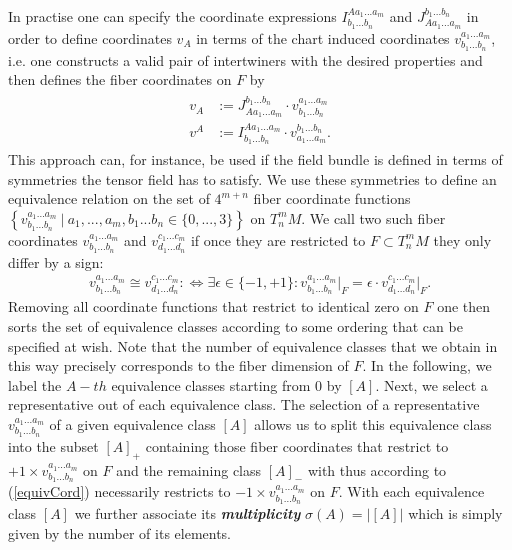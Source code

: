 \documentclass[a4paper,12pt, DIV=14, BCOR=5mm, twoside, headsepline, numbers=noenddot]{scrbook}
\begin{document}
In practise one can specify the coordinate expressions $I^{A a_1 ... a_m}_{b_1 ... b_n}$ and $J^{b_1 ... b_n}_{A a_1 ... a_m}$ in order to define coordinates $v_A$ in terms of the chart induced coordinates $v^{a_1 ... a_m}_{b_1 ... b_n}$, i.e. one constructs a valid pair of intertwiners with the desired properties and then defines the fiber coordinates on $F$ by
\begin{align}
    \begin{aligned}
    v_A &:= J^{b_1 ... b_n}_{A a_1 ... a_m} \cdot v^{a_1 ... a_m}_{b_1 ... b_n}\\
    v^A &:= I^{A a_1 ... a_m}_{b_1 ... b_n} \cdot  v^{b_1 ... b_n}_{a_1 ... a_m} .
    \end{aligned}
\end{align}
This approach can, for instance, be used if the field bundle is defined in terms of symmetries the tensor field has to satisfy. We use these symmetries to define an equivalence relation on the set of $4^{m+n}$ fiber coordinate functions $\left \{ v^{a_1 ... a_m}_{b_1 ... b_n} \ \vert \  a_1,...,a_m,b_1...b_n \in \{0,...,3 \} \right \}$ on $T^m_nM$. We call two such fiber coordinates $v^{a_1 ... a_m}_{b_1 ... b_n}$ and $v^{c_1 ... c_m}_{d_1 ... d_n}$ if once they are restricted to $F \subset T^m_nM$ they only differ by a sign:
\begin{align}\label{equivCord}
v^{a_1 ... a_m}_{b_1 ... b_n} \cong v^{c_1 ... c_m}_{d_1 ... d_n} : \iff \exists \epsilon \in \{-1,+1 \} : v^{a_1 ... a_m}_{b_1 ... b_n}\vert _F = \epsilon \cdot  v^{c_1 ... c_m}_{d_1 ... d_n}\vert_F.
\end{align}
Removing all coordinate functions that restrict to identical zero on $F$ one then sorts the set of equivalence classes according to some ordering that can be specified at wish.  Note that the number of equivalence classes that we obtain in this way precisely corresponds to the fiber dimension of $F$. In the following, we label the $A-th$ equivalence classes starting from 0 by $[A]$. Next, we select a representative out of each equivalence class.  The selection of a representative $v^{a_1 ... a_m}_{b_1 ... b_n}$ of a given equivalence class $[A]$ allows us to split this equivalence class into the subset $[A]_+$ containing those fiber coordinates that restrict to $+1 \times v^{a_1 ... a_m}_{b_1 ... b_n}$  on $F$ and the remaining class $[A]_-$ with thus according to (\ref{equivCord}) necessarily restricts to $-1 \times v^{a_1 ... a_m}_{b_1 ... b_n}$ on $F$.
With each equivalence class $[A]$ we further associate its \textbf{\textit{multiplicity}} $\sigma(A) = \vert [A] \vert$ which is simply given by the number of its elements.
\end{document}
